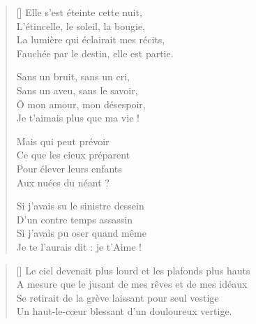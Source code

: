 \newpage

\settowidth{\versewidth}{Fauchée par le destin, elle est partie.}
\begin{verse}[\versewidth]
Elle s'est éteinte cette nuit, \\
L'étincelle, le soleil, la bougie, \\
La lumière qui éclairait mes récits, \\
Fauchée par le destin, elle est partie.

Sans un bruit, sans un cri, \\
Sans un aveu, sans le savoir, \\
Ô mon amour, mon désespoir, \\
Je t'aimais plus que ma vie !

Mais qui peut prévoir \\
Ce que les cieux préparent \\
Pour élever leurs enfants \\
Aux nuées du néant ?

Si j'avais su le sinistre dessein \\
D'un contre temps assassin \\
Si j'avais pu oser quand même \\
Je te l'aurais dit : je t'Aime !

\end{verse}


\settowidth{\versewidth}{Le ciel devenait plus lourd et les plafonds plus hauts}
\begin{verse}[\versewidth]
Le ciel devenait plus lourd et les plafonds plus hauts \\
A mesure que le jusant de mes rêves et de mes idéaux \\
Se retirait de la grève laissant pour seul vestige \\
Un haut-le-cœur blessant d'un douloureux vertige.
\end{verse}

\newpage

